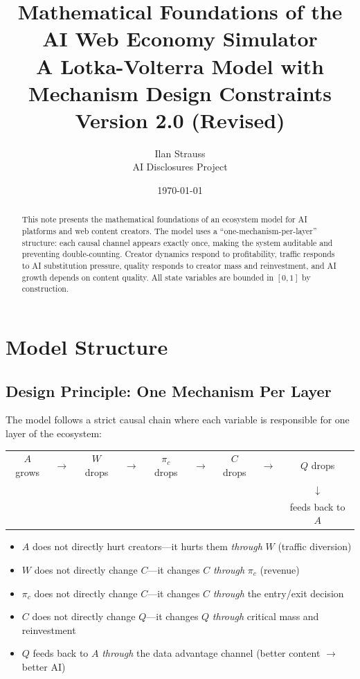 \documentclass[11pt,a4paper]{article}
\title{Mathematical Foundations of the AI Web Economy Simulator\\[0.5em]\large A Lotka-Volterra Model with Mechanism Design Constraints\\[0.3em]\normalsize Version 2.0 (Revised)}
\author{Ilan Strauss\\[0.5em]\small AI Disclosures Project}
\date{\today}
\begin{document}
\maketitle

\begin{abstract}
This note presents the mathematical foundations of an ecosystem model for AI platforms and web content creators. The model uses a ``one-mechanism-per-layer'' structure: each causal channel appears exactly once, making the system auditable and preventing double-counting. Creator dynamics respond to profitability, traffic responds to AI substitution pressure, quality responds to creator mass and reinvestment, and AI growth depends on content quality. All state variables are bounded in $[0,1]$ by construction.
\end{abstract}

\section{Model Structure}

\subsection{Design Principle: One Mechanism Per Layer}

The model follows a strict causal chain where each variable is responsible for one layer of the ecosystem:

\begin{center}
\begin{tabular}{ccccccccc}
$A$ grows & $\rightarrow$ & $W$ drops & $\rightarrow$ & $\pi_c$ drops & $\rightarrow$ & $C$ drops & $\rightarrow$ & $Q$ drops \\
& & & & & & & & $\downarrow$ \\
& & & & & & & & feeds back to $A$
\end{tabular}
\end{center}

\begin{itemize}
    \item $A$ does not directly hurt creators---it hurts them \textit{through} $W$ (traffic diversion)
    \item $W$ does not directly change $C$---it changes $C$ \textit{through} $\pi_c$ (revenue)
    \item $\pi_c$ does not directly change $C$---it changes $C$ \textit{through} the entry/exit decision
    \item $C$ does not directly change $Q$---it changes $Q$ \textit{through} critical mass and reinvestment
    \item $Q$ feeds back to $A$ \textit{through} the data advantage channel (better content $\rightarrow$ better AI)
\end{itemize}
\end{document}
